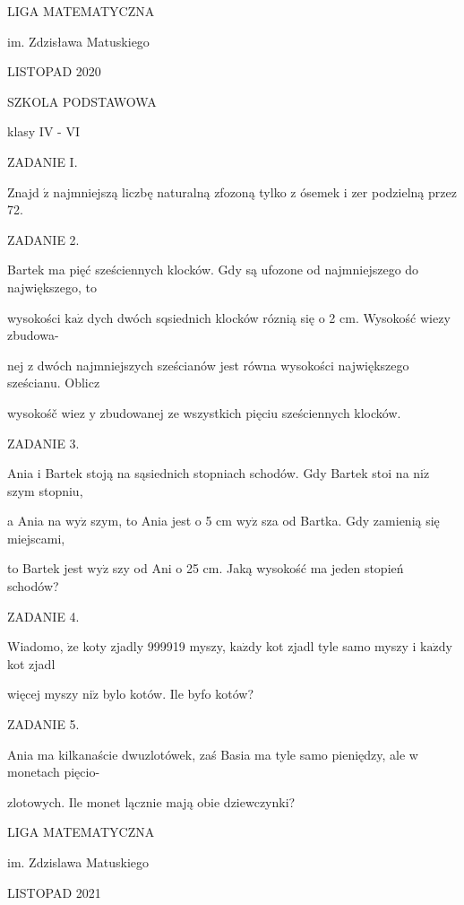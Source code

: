 \documentclass[a4paper,12pt]{article}
\begin{document}
LIGA MATEMATYCZNA

im. Zdzisława Matuskiego

LISTOPAD 2020

SZKOLA PODSTAWOWA

klasy IV - VI

ZADANIE I.

Znajd $\acute{\mathrm{z}}$ najmniejszą liczbę naturalną zfozoną tylko z ósemek i zer podzielną przez 72.

ZADANIE 2.

Bartek ma pięć sześciennych klocków. Gdy są ufozone od najmniejszego do największego, to

wysokości $\mathrm{k}\mathrm{a}\dot{\mathrm{z}}$ dych dwóch sqsiednich klocków róznią się o 2 cm. Wysokość wiezy zbudowa-

nej z dwóch najmniejszych sześcianów jest równa wysokości największego sześcianu. Oblicz

wysokośč wiez $\mathrm{y}$ zbudowanej ze wszystkich pięciu sześciennych klocków.

ZADANIE 3.

Ania i Bartek stoją na sąsiednich stopniach schodów. Gdy Bartek stoi na $\mathrm{n}\mathrm{i}\dot{\mathrm{z}}$ szym stopniu,

a Ania na $\mathrm{w}\mathrm{y}\dot{\mathrm{z}}$ szym, to Ania jest o 5 cm $\mathrm{w}\mathrm{y}\dot{\mathrm{z}}$ sza od Bartka. Gdy zamienią się miejscami,

to Bartek jest $\mathrm{w}\mathrm{y}\dot{\mathrm{z}}$ szy od Ani o 25 cm. Jaką wysokość ma jeden stopień schodów?

ZADANIE 4.

Wiadomo, $\dot{\mathrm{z}}\mathrm{e}$ koty zjadly 999919 myszy, $\mathrm{k}\mathrm{a}\dot{\mathrm{z}}\mathrm{d}\mathrm{y}$ kot zjadl tyle samo myszy i $\mathrm{k}\mathrm{a}\dot{\mathrm{z}}\mathrm{d}\mathrm{y}$ kot zjadl

więcej myszy $\mathrm{n}\mathrm{i}\dot{\mathrm{z}}$ bylo kotów. Ile byfo kotów?

ZADANIE 5.

Ania ma kilkanaście dwuzlotówek, zaś Basia ma tyle samo pieniędzy, ale w monetach pięcio-

zlotowych. Ile monet lącznie mają obie dziewczynki?






LIGA MATEMATYCZNA

im. Zdzislawa Matuskiego

LISTOPAD 2021
\end{document}
